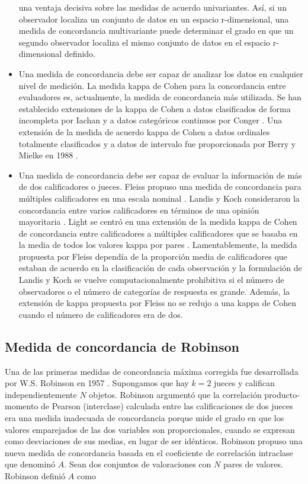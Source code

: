 \documentclass[12pt,a4paper,]{book}
\numberwithin{dummy}{section}
\theoremstyle{ocrenumbox}
\theoremstyle{blacknumex}
\theoremstyle{blacknumbox}
\theoremstyle{ocrenum}
\theoremstyle{ocrenum}
\begin{document}
\begin{itemize}
  una ventaja decisiva sobre las medidas de acuerdo univariantes. Así,
  si un observador localiza un conjunto de datos en un espacio
  r-dimensional, una medida de concordancia multivariante puede
  determinar el grado en que un segundo observador localiza el mismo
  conjunto de datos en el espacio r-dimensional definido.
\item
  Una medida de concordancia debe ser capaz de analizar los datos en
  cualquier nivel de medición. La medida kappa de Cohen para la
  concordancia entre evaluadores es, actualmente, la medida de
  concordancia más utilizada. Se han establecido extensiones de la kappa
  de Cohen a datos clasificados de forma incompleta por Iachan
  \citep{Iachan1984} y a datos categóricos continuos por Conger
  \citep{Conger1985}. Una extensión de la medida de acuerdo kappa de
  Cohen a datos ordinales totalmente clasificados y a datos de intervalo
  fue proporcionada por Berry y Mielke en 1988 \citep{Berry1988}.
\item
  Una medida de concordancia debe ser capaz de evaluar la información de
  más de dos calificadores o jueces. Fleiss propuso una medida de
  concordancia para múltiples calificadores en una escala nominal
  \citep{Fleiss1971}. Landis y Koch consideraron la concordancia entre
  varios calificadores en términos de una opinión mayoritaria
  \citep{Landis1977}. Light se centró en una extensión de la medida
  kappa de Cohen \citep{Cohen1960} de concordancia entre calificadores a
  múltiples calificadores que se basaba en la media de todos los valores
  kappa por pares \citep{Light1971.2}. Lamentablemente, la medida
  propuesta por Fleiss dependía de la proporción media de calificadores
  que estaban de acuerdo en la clasificación de cada observación y la
  formulación de Landis y Koch se vuelve computacionalmente prohibitiva
  si el número de observadores o el número de categorías de respuesta es
  grande. Además, la extensión de kappa propuesta por Fleiss no se
  redujo a una kappa de Cohen cuando el número de calificadores era de
  dos.
\end{itemize}

\hypertarget{medida-de-concordancia-de-robinson}{%
\subsection{Medida de concordancia de
Robinson}\label{medida-de-concordancia-de-robinson}}

Una de las primeras medidas de concordancia máxima corregida fue
desarrollada por W.S. Robinson en 1957 \citep{Robinson1957}. Supongamos
que hay \(k = 2\) jueces y califican independientemente \(N\) objetos.
Robinson argumentó que la correlación producto-momento de Pearson
(interclase) calculada entre las calificaciones de dos jueces era una
medida inadecuada de concordancia porque mide el grado en que los
valores emparejados de las dos variables son proporcionales, cuando se
expresan como desviaciones de sus medias, en lugar de ser idénticos.
Robinson propuso una nueva medida de concordancia basada en el
coeficiente de correlación intraclase que denominó \(A\). Sean dos
conjuntos de valoraciones con \(N\) pares de valores. Robinson definió
\(A\) como
\end{document}
